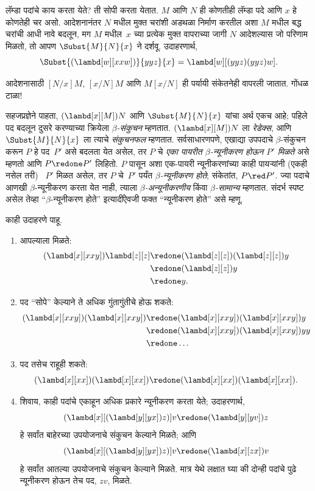 लॅम्डा पदांचे काय करता येते? ती सोपी करता येतात. $M$ आणि $N$ ही
कोणतीही लॅम्डा पदे आणि $x$ हे कोणतेही चर असो. आदेशनानंतर $N$ मधील
मुक्त चरांशी अडथळा निर्माण करतील अशा $M$ मधील बद्ध चरांची आधी
नावे बदलून, मग $M$ मधील~$x$ च्या प्रत्येक मुक्त वापराच्या जागी $N$ आदेशल्यास जो परिणाम
मिळतो, तो आपण $\Subst{M}{N}{x}$ ने दर्शवू. उदाहरणार्थ,
\[\Subst{(\lambd[w][xxw])}{yyz}{x} = \lambd[w][(yyz)(yyz)w].
\]

\begin{digress}
आदेशनासाठी $[N/x]M$, $[x/N]M$ आणि $M[x/N]$ ही पर्यायी
संकेतनेही वापरली जातात. गोंधळ टाळा!
\end{digress}

सहजप्रज्ञेने पाहता, $(\lambd[x][M])N$ आणि $\Subst{M}{N}{x}$
यांचा अर्थ एकच आहे; पहिले पद बदलून दुसरे करण्याच्या क्रियेला
\emph{$\beta$-संकुचन} म्हणतात. $(\lambd[x][M])N$ ला
\emph{रेडेक्स}, आणि $\Subst{M}{N}{x}$ ला त्याचे
\emph{संकुचनफल} म्हणतात. सर्वसाधारणपणे, एखाद्या उपपदाचे
$\beta$-संकुचन करून $P$ हे पद~$P'$ असे बदलता येत असेल, तर
$P$ चे \emph{एका पायरीत $\beta$-न्यूनीकरण होऊन $P'$ मिळते}
असे म्हणतो आणि $P \redone P'$ लिहितो. $P$ पासून अशा
एक-पायरी न्यूनीकरणांच्या काही पायऱ्यांनी (एकही नसेल तरी)
~$P'$ मिळत असेल, तर $P$ चे~$P'$ पर्यंत
\emph{$\beta$-न्यूनीकरण होते}; संकेतांत, $P \red P'$.
ज्या पदाचे आणखी $\beta$-न्यूनीकरण करता येत नाही, त्याला
\emph{$\beta$-अन्यूनीकरणीय} किंवा \emph{$\beta$-सामान्य}
म्हणतात. संदर्भ स्पष्ट असेल तेव्हा “$\beta$-न्यूनीकरण होते”
इत्यादींऐवजी फक्त “न्यूनीकरण होते” असे म्हणू.

काही उदाहरणे पाहू.
\begin{enumerate}
\item आपल्याला मिळते:
\begin{align*}
(\lambd[x][xxy]) \lambd[z][z] & \redone (\lambd[z][z])(\lambd[z][z]) y \\
& \redone (\lambd[z][z]) y \\
& \redone y.
\end{align*}
\item पद “सोपे” केल्याने ते अधिक गुंतागुंतीचे होऊ शकते:
\begin{align*}
(\lambd[x][xxy])(\lambd[x][xxy]) & \redone (\lambd[x][xxy])(\lambd[x][xxy])y \\
& \redone (\lambd[x][xxy])(\lambd[x][xxy])yy \\
& \redone \dots
\end{align*}
\item पद तसेच राहूही शकते:
\[(\lambd[x][xx])(\lambd[x][xx]) \redone (\lambd[x][xx])(\lambd[x][xx]).
\]
\item शिवाय, काही पदांचे एकाहून अधिक प्रकारे न्यूनीकरण करता येते;
  उदाहरणार्थ,
\[(\lambd[x][(\lambd[y][yx]) z)] v \redone (\lambd[y][yv]) z
\]
हे सर्वांत बाहेरच्या उपयोजनाचे संकुचन केल्याने मिळते; आणि
\[(\lambd[x][(\lambd[y][yx]) z)] v \redone (\lambd[x][zx]) v
\]
हे सर्वांत आतल्या उपयोजनाचे संकुचन केल्याने मिळते. मात्र येथे
लक्षात घ्या की दोन्ही पदांचे पुढे न्यूनीकरण होऊन तेच पद, $zv$, मिळते.
\end{enumerate}

